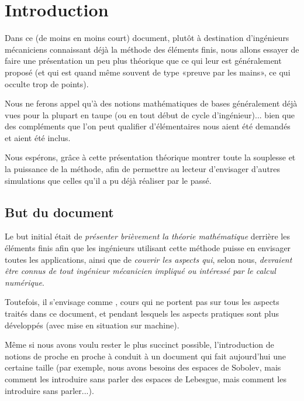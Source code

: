 \documentclass[11pt,pdflatex]{book}
\begin{document}
\chapter*{Introduction}
\ifVersionDuDocEstVincent\else{}\fi
{}

Dans ce (de moins en moins court) document, plutôt à destination d'ingénieurs mécaniciens  connaissant déjà la méthode des éléments finis, nous allons essayer de faire une présentation un peu plus théorique que ce qui leur est généralement proposé (et qui est quand même souvent de type «preuve par les mains», ce qui occulte trop de points).

Nous ne ferons appel qu'à des notions mathématiques de bases généralement déjà vues pour la plupart en taupe (ou en tout début de cycle d'ingénieur)... bien que des compléments que l'on peut qualifier d'élémentaires nous aient été demandés et aient été inclus.

Nous espérons, grâce à cette présentation théorique montrer toute la souplesse et la puissance de la méthode, afin de permettre au lecteur d'envisager d'autres simulations que celles qu'il a pu déjà réaliser par le passé.





\bigskip
\section*{But du document}

Le but initial était de \emph{présenter brièvement la théorie mathématique} derrière les éléments finis afin que les ingénieurs utilisant cette méthode puisse en envisager toutes les applications, ainsi que de \emph{couvrir les aspects qui}, selon nous, \emph{devraient être connus de tout ingénieur mécanicien impliqué ou intéressé par le calcul numérique}.

Toutefois, il s'envisage comme , cours qui ne portent pas sur tous les aspects traités dans ce document, et pendant lesquels les aspects pratiques sont plus développés (avec mise en situation sur machine).

\medskip
Même si nous avons voulu rester le plus succinct possible, l'introduction de notions de proche en proche à conduit à un document qui fait aujourd'hui une certaine taille (par exemple, nous avons besoins des espaces de Sobolev, mais comment les introduire sans parler des espaces de Lebesgue, mais comment les introduire sans parler...).
\end{document}
